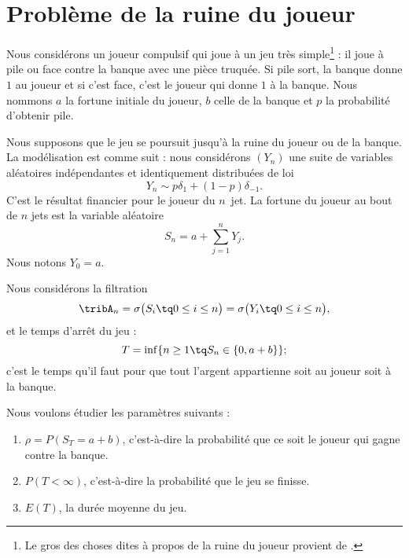 \section{Problème de la ruine du joueur}
\label{SecMSOjfgM}

Nous considérons un joueur compulsif qui joue à un jeu très simple\footnote{Le gros des choses dites à propos de la ruine du joueur provient de \cite{KXjFWKA}.} : il joue à pile ou face contre la banque avec une pièce truquée. Si pile sort, la banque donne \( 1\) au joueur et si c'est face, c'est le joueur qui donne \( 1\) à la banque. Nous nommons \( a\) la fortune initiale du joueur,  \( b\) celle de la banque et \( p\) la probabilité d'obtenir pile.

Nous supposons que le jeu se poursuit jusqu'à la ruine du joueur ou de la banque. La modélisation est comme suit : nous considérons \( (Y_n)\) une suite de variables aléatoires indépendantes et identiquement distribuées de loi
\begin{equation}
	Y_n\sim p\delta_1+(1-p)\delta_{-1}.
\end{equation}
C'est le résultat financier pour le joueur du \( n\)\ieme\ jet. La fortune du joueur au bout de \( n\) jets est la variable aléatoire
\begin{equation}
	S_n=a+\sum_{j=1}^nY_j.
\end{equation}
Nous notons \( Y_0=a\).

Nous considérons la filtration
\begin{equation}
	\tribA_n=\sigma\big( S_i\tq 0\leq i\leq n \big)=\sigma\big( Y_i\tq 0\leq i\leq n \big),
\end{equation}
et le temps d'arrêt du jeu :
\begin{equation}
	T=\inf\{ n\geq 1\tq S_n\in\{ 0,a+b \} \};
\end{equation}
c'est le temps qu'il faut pour que tout l'argent appartienne soit au joueur soit à la banque.

Nous voulons étudier les paramètres suivants :
\begin{enumerate}
	\item
	      \( \rho=P(S_T=a+b)\), c'est-à-dire la probabilité que ce soit le joueur qui gagne contre la banque.
	\item
	      \( P(T<\infty)\), c'est-à-dire la probabilité que le jeu se finisse.
	\item
	      \( E(T)\), la durée moyenne du jeu.
\end{enumerate}

